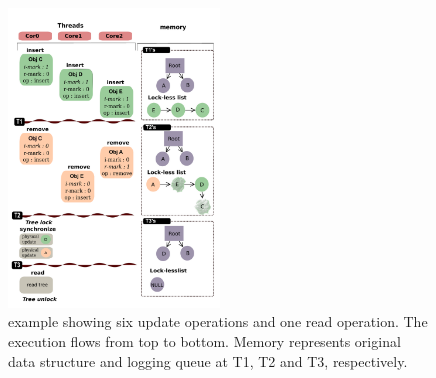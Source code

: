 

%

\begin{figure}[tb]
  \begin{center}
     \includegraphics[width=0.5\textwidth,height=0.5\textheight,keepaspectratio]{fig/basic}
  \end{center}
  \caption{ example showing six update operations and one read
  operation. The execution flows from top to bottom. Memory represents original
  data structure and logging queue at T1, T2 and T3, respectively.}
  \label{fig:basic}
\end{figure}


